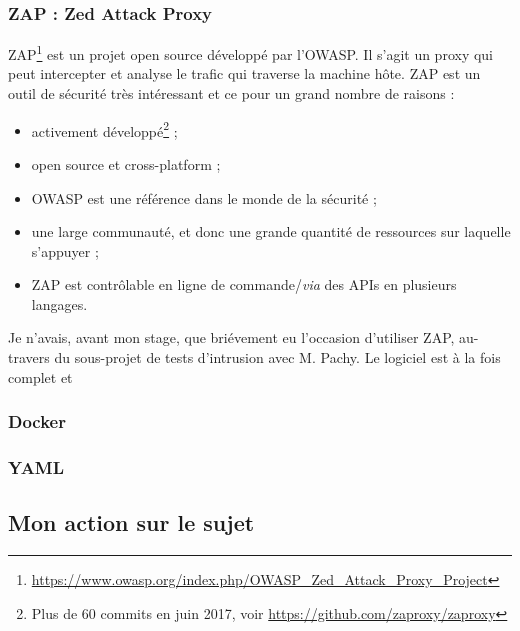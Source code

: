 \subsubsection{ZAP : Zed Attack Proxy}
ZAP\footnote{\url{https://www.owasp.org/index.php/OWASP_Zed_Attack_Proxy_Project}} est un projet open source développé par l'OWASP. Il s'agit un proxy qui peut intercepter et analyse le trafic qui traverse la machine hôte. ZAP est un outil de sécurité très intéressant et ce pour un grand nombre de raisons :
\begin{itemize}[label=$\bulllet$]
\item activement développé\footnote{Plus de 60 commits en juin 2017, voir \url{https://github.com/zaproxy/zaproxy}} ;
\item open source et cross-platform ;
\item OWASP est une référence dans le monde de la sécurité ;
\item une large communauté, et donc une grande quantité de ressources sur laquelle s'appuyer ;
\item ZAP est contrôlable en ligne de commande/\textit{via} des APIs en plusieurs langages.
\end{itemize}

Je n'avais, avant mon stage, que briévement eu l'occasion d'utiliser ZAP, au-travers du sous-projet de tests d'intrusion avec M. Pachy. Le logiciel est à la fois complet et

\subsubsection{Docker}
\subsubsection{YAML}

\subsection{Mon action sur le sujet}